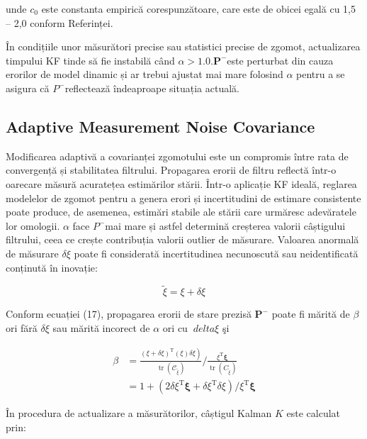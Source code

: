 \documentclass[10pt]{report}
\begin{document}
unde $c_{0}$ este constanta empirică corespunzătoare, care este de obicei egală cu 1,5 -- 2,0 conform Referinței.

În condițiile unor măsurători precise sau statistici precise de zgomot, actualizarea timpului KF tinde să fie instabilă când $\alpha>1.0 . \mathbf{P}^{-}$este perturbat din cauza erorilor de model dinamic și ar trebui ajustat mai mare folosind $\alpha$ pentru a se asigura că $P^{-}$reflectează îndeaproape situația actuală.
\subsection*{Adaptive Measurement Noise Covariance}
Modificarea adaptivă a covarianței zgomotului este un compromis între rata de convergență și stabilitatea filtrului. Propagarea erorii de filtru reflectă într-o oarecare măsură acuratețea estimărilor stării. Într-o aplicație KF ideală, reglarea modelelor de zgomot pentru a genera erori și incertitudini de estimare consistente poate produce, de asemenea, estimări stabile ale stării care urmăresc adevăratele lor omologii. $\alpha$ face $P^{-}$mai mare și astfel determină creșterea valorii câștigului filtrului, ceea ce crește contribuția valorii outlier de măsurare. Valoarea anormală de măsurare $\delta \xi$ poate fi considerată incertitudinea necunoscută sau neidentificată conținută în inovație:

\begin{equation}
  \widetilde{\xi}=\xi+\delta \xi
\end{equation}

Conform ecuației (17), propagarea erorii de stare prezisă $\boldsymbol{P}^{-}$ poate fi mărită de $\beta$ ori fără $\delta \xi$ sau mărită incorect de $\alpha$ ori cu $\ delta \xi$ şi

\begin{equation}
  \begin{aligned}
    \beta & =\frac{\left.(\xi+\delta \xi)^{\mathrm{T}}(\xi) \delta \xi\right)}{\operatorname{tr}\left(\mathcal{C}_{\tilde{\xi}}\right)} / \frac{\xi^{\mathrm{T}} \boldsymbol{\xi}}{\operatorname{tr}\left(C_{\tilde{\xi}}\right)} \\
          & =1+\left(2 \delta \xi^{\mathrm{T}} \boldsymbol{\xi}+\delta \xi^{\mathrm{T}} \delta \xi\right) / \xi^{\mathrm{T}} \boldsymbol{\xi}
  \end{aligned}
\end{equation}


În procedura de actualizare a măsurătorilor, câștigul Kalman $K$ este calculat prin:
\end{document}

